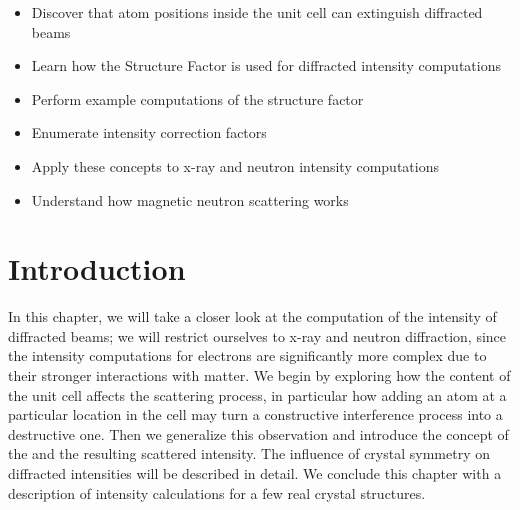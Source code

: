 \begin{learningobjectives}
{\begin{itemize}
    \item[{\color{OCBurntOrange}\ref{\chabbr:sec:BraggRevisited}:}] Discover that atom positions inside the unit cell can extinguish diffracted beams
    \item[{\color{OCBurntOrange}\ref{\chabbr:sec:structurefactor}:}] Learn how the Structure Factor is used for diffracted intensity computations
    \item[{\color{OCBurntOrange}\ref{\chabbr:sec:SFexamples}:}] Perform example computations of the structure factor
    \item[{\color{OCBurntOrange}\ref{\chabbr:sec:Icomputations}:}] Enumerate intensity correction factors
    \item[{\color{OCBurntOrange}\ref{\chabbr:sec:ncomputations}:}] Apply these concepts to x-ray and neutron intensity computations
    \item[{\color{OCBurntOrange}\ref{\chabbr:sec:nmagnetic}:}] Understand how magnetic neutron scattering works
\end{itemize}}
\end{learningobjectives}



\section{Introduction}\label{\chabbr:sec:introduction}
In this chapter, we will take a closer look at the computation of the intensity of diffracted beams; we will restrict ourselves to x-ray and neutron diffraction, since the intensity computations for electrons are significantly more complex due to their stronger interactions with matter.  We begin by exploring how the content of the unit cell affects the scattering process, in particular how adding an atom at a particular location in the cell may turn a constructive interference process into a destructive one. Then we generalize this observation and introduce the concept of the  and the resulting scattered intensity.  The influence of crystal symmetry on diffracted intensities will be described in detail. We conclude this chapter with a description of intensity calculations for a few real crystal structures.  

